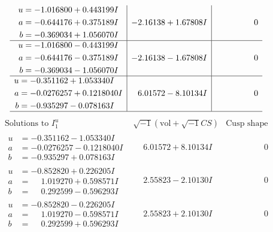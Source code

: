 \documentclass[1p]{elsarticle_modified}
\theoremstyle{definition}
\newcommand{\I}{\sqrt{-1}}
\begin{document}
$$\begin{array}{c|c|c}
\begin{aligned}
u &= -1.016800 + 0.443199 I \\
a &= -0.644176 + 0.375189 I \\
b &= -0.369034 + 1.056070 I\end{aligned}
 & -2.16138 + 1.67808 I & \phantom{-0.000000 } 0 \\ \hline\begin{aligned}
u &= -1.016800 - 0.443199 I \\
a &= -0.644176 - 0.375189 I \\
b &= -0.369034 - 1.056070 I\end{aligned}
 & -2.16138 - 1.67808 I & \phantom{-0.000000 } 0 \\ \hline\begin{aligned}
u &= -0.351162 + 1.053340 I \\
a &= -0.0276257 + 0.1218040 I \\
b &= -0.935297 - 0.078163 I\end{aligned}
 & \phantom{-}6.01572 - 8.10134 I & \phantom{-0.000000 } 0\\
 \hline 
 \end{array}$$\newpage$$\begin{array}{c|c|c}  
\text{Solutions to }I^u_{1}& \I (\text{vol} + \sqrt{-1}CS) & \text{Cusp shape}\\
 \hline 
\begin{aligned}
u &= -0.351162 - 1.053340 I \\
a &= -0.0276257 - 0.1218040 I \\
b &= -0.935297 + 0.078163 I\end{aligned}
 & \phantom{-}6.01572 + 8.10134 I & \phantom{-0.000000 } 0 \\ \hline\begin{aligned}
u &= -0.852820 + 0.226205 I \\
a &= \phantom{-}1.019270 + 0.598571 I \\
b &= \phantom{-}0.292599 - 0.596293 I\end{aligned}
 & \phantom{-}2.55823 - 2.10130 I & \phantom{-0.000000 } 0 \\ \hline\begin{aligned}
u &= -0.852820 - 0.226205 I \\
a &= \phantom{-}1.019270 - 0.598571 I \\
b &= \phantom{-}0.292599 + 0.596293 I\end{aligned}
 & \phantom{-}2.55823 + 2.10130 I & \phantom{-0.000000 } 0 \\ \hline\begin{aligned}

\end{aligned}
\end{array}$$
\end{document}
